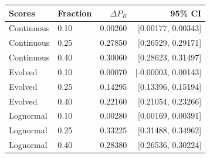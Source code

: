 \begin{tabular}{llrr}
\toprule
Scores & Fraction & $\Delta P_B$ & 95\% CI \\
\midrule
Continuous & 0.10 & 0.00260 & [0.00177, 0.00343] \\
Continuous & 0.25 & 0.27850 & [0.26529, 0.29171] \\
Continuous & 0.40 & 0.30060 & [0.28623, 0.31497] \\
Evolved & 0.10 & 0.00070 & [-0.00003, 0.00143] \\
Evolved & 0.25 & 0.14295 & [0.13396, 0.15194] \\
Evolved & 0.40 & 0.22160 & [0.21054, 0.23266] \\
Lognormal & 0.10 & 0.00280 & [0.00169, 0.00391] \\
Lognormal & 0.25 & 0.33225 & [0.31488, 0.34962] \\
Lognormal & 0.40 & 0.28380 & [0.26536, 0.30224] \\
\bottomrule
\end{tabular}
